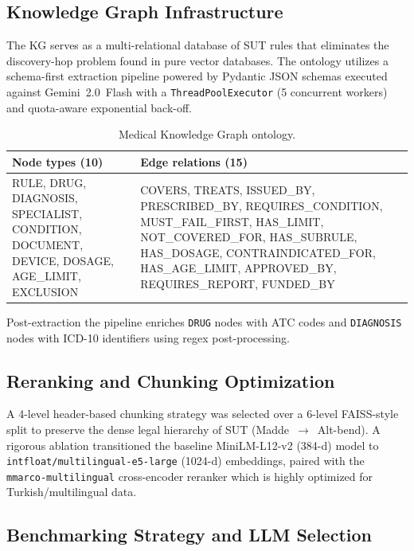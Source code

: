 \documentclass[11pt, a4paper]{article}
\begin{document}
\subsection{Knowledge Graph Infrastructure}

The KG serves as a multi-relational database of SUT rules that eliminates the discovery-hop problem found in pure vector databases. The ontology utilizes a schema-first extraction pipeline powered by Pydantic JSON schemas executed against Gemini~2.0~Flash with a \texttt{ThreadPoolExecutor} (5 concurrent workers) and quota-aware exponential back-off.

\begin{table}[H]
    \centering
    \footnotesize
    \caption{Medical Knowledge Graph ontology.}
    \begin{tabularx}{\textwidth}{@{}>{\raggedright\arraybackslash}X >{\raggedright\arraybackslash}X@{}}
        \toprule
        \textbf{Node types (10)} & \textbf{Edge relations (15)} \\
        \midrule
        RULE, DRUG, DIAGNOSIS, SPECIALIST, CONDITION, DOCUMENT, DEVICE, DOSAGE, AGE\_LIMIT, EXCLUSION
        & COVERS, TREATS, ISSUED\_BY, PRESCRIBED\_BY, REQUIRES\_CONDITION, MUST\_FAIL\_FIRST, HAS\_LIMIT, NOT\_COVERED\_FOR, HAS\_SUBRULE, HAS\_DOSAGE, CONTRAINDICATED\_FOR, HAS\_AGE\_LIMIT, APPROVED\_BY, REQUIRES\_REPORT, FUNDED\_BY \\
        \bottomrule
    \end{tabularx}
\end{table}

Post-extraction the pipeline enriches \texttt{DRUG} nodes with ATC codes and \texttt{DIAGNOSIS} nodes with ICD-10 identifiers using regex post-processing.

\subsection{Reranking and Chunking Optimization}

A 4-level header-based chunking strategy was selected over a 6-level FAISS-style split to preserve the dense legal hierarchy of SUT (Madde~$\to$~Alt-bend). A rigorous ablation transitioned the baseline MiniLM-L12-v2 (384-d) model to \texttt{intfloat/multilingual-e5-large} (1024-d) embeddings, paired with the \texttt{mmarco-multilingual} cross-encoder reranker which is highly optimized for Turkish/multilingual data.

\subsection{Benchmarking Strategy and LLM Selection}
\end{document}

